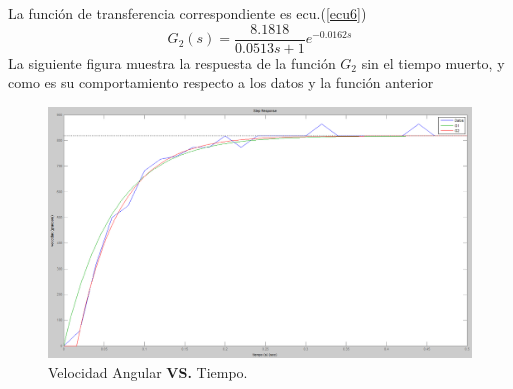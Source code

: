 \documentclass[twocolumn]{IEEEtran}
\begin{document}
\noindent
La función de transferencia correspondiente es ecu.(\ref{ecu6})
\begin{equation}
 G_2(s)=\frac{8.1818}{0.0513s+1}e^{-0.0162s}
\label{ecu6}
\end{equation}
\noindent
La siguiente figura muestra la respuesta de la función $G_2$ sin el tiempo muerto, y como es su comportamiento respecto a los datos y la función anterior
\begin{figure}[H]
	\centering
		\includegraphics[scale=0.17]{figure4.png}
	\caption{Velocidad Angular \textbf{VS.} Tiempo.}
	\label{fig4}
\end{figure}
\end{document}
